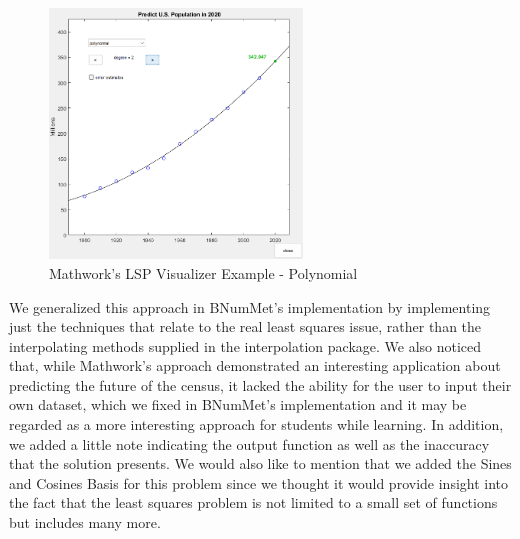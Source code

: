 \begin{figure}[H]
    \centering
    \includegraphics[width=0.6\textwidth]{Include/Images/Thesis/Development/Visualizers/LSP/Mathworks.LSP.Ex1.3.png}
    \caption{Mathwork's LSP Visualizer Example - Polynomial}
    \label{fig:Mathwork's Least Squares Visualizer Example- Polynomial}
\end{figure}

We generalized this approach in BNumMet's implementation by implementing just the techniques that relate to the real least squares issue, rather than the interpolating methods supplied in the interpolation package. We also noticed that, while Mathwork's approach demonstrated an interesting application about predicting the future of the census, it lacked the ability for the user to input their own dataset, which we fixed in BNumMet's implementation and it may be regarded as a more interesting approach for students while learning.  In addition, we added a little note indicating the output function as well as the inaccuracy that the solution presents. We would also like to mention that we added the Sines and Cosines Basis for this problem since we thought it would provide insight into the fact that the least squares problem is not limited to a small set of functions but includes many more.

